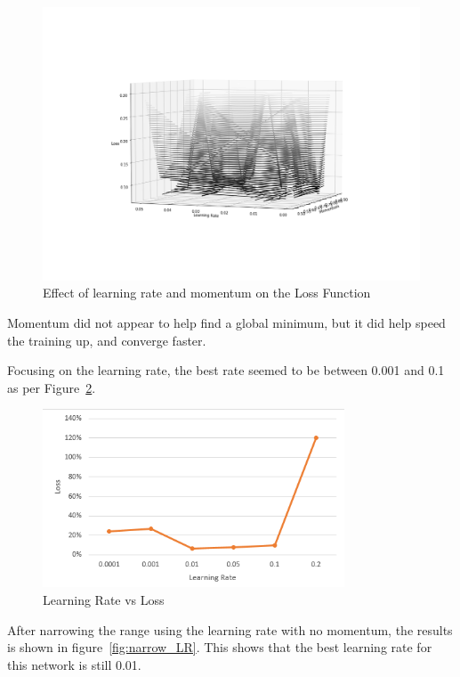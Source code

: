\begin{figure}[H]
\caption{Effect of learning rate and momentum on the Loss Function}
\label{fig:leaky}
\centering
\includegraphics[width=1.0\textwidth]{Figures/momentum_test.png}
\end{figure}

Momentum did not appear to help find a global minimum, but it did help speed the training up, and converge faster.

Focusing on the learning rate, the best rate seemed to be between 0.001 and 0.1 as per Figure~\ref{fig:loss_learn}.

\begin{figure}[H]
\caption{Learning Rate vs Loss}  \label{fig:loss_learn} 
\centering
\includegraphics[width=0.8\textwidth]{Figures/LearningRate1.PNG}
\end{figure}

After narrowing the range using the learning rate with no momentum, the results is shown in figure~\ref{fig:narrow_LR}. This shows that the best learning rate for this network is still 0.01.

